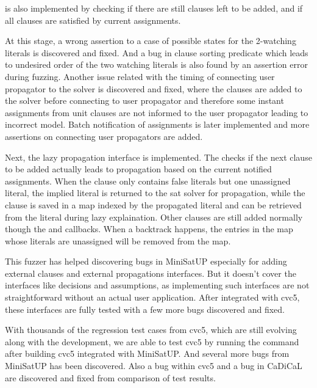 
 is also implemented by checking if there are still clauses left to be added, and if all clauses are satisfied by current assignments.

At this stage, a wrong assertion to a case of possible states for the 2-watching literals is discovered and fixed. And a bug in clause sorting predicate which leads to undesired order of the two watching literals is also found by an assertion error during fuzzing. Another issue related with the timing of connecting user propagator to the solver is discovered and fixed, where the clauses are added to the solver before connecting to user propagator and therefore some instant assignments from unit clauses are not informed to the user propagator leading to incorrect model. Batch notification of assignments is later implemented and more assertions on connecting user propagators are added.

Next, the lazy propagation interface is implemented. The  checks if the next clause to be added actually leads to propagation based on the current notified assignments. When the clause only contains false literals but one unassigned literal, the implied literal is returned to the sat solver for propagation, while the clause is saved in a map indexed by the propagated literal and can be retrieved from the literal during lazy explaination. Other clauses are still added normally though the  and  callbacks. When a backtrack happens, the entries in the map whose literals are unassigned will be removed from the map.

This fuzzer has helped discovering bugs in MiniSatUP especially for adding external clauses and external propagations interfaces. But it doesn't cover the interfaces like decisions and assumptions, as implementing such interfaces are not straightforward without an actual user application. After integrated with cvc5, these interfaces are fully tested with a few more bugs discovered and fixed.

With thousands of the regression test cases from cvc5, which are still evolving along with the development, we are able to test cvc5 by running the  command after building cvc5 integrated with MiniSatUP. And several more bugs from MiniSatUP has been discovered. Also a bug within cvc5 and a bug in CaDiCaL are discovered and fixed from comparison of test results.

